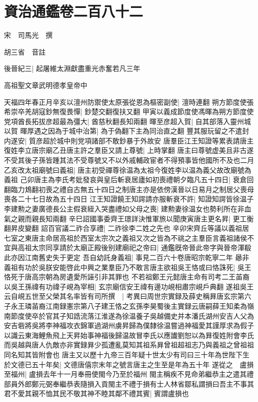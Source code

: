 \section{資治通鑑卷二百八十二}
宋　司馬光　撰

胡三省　音註

後晉紀三|{
	起屠維太淵獻盡重光赤奮若凡三年}


高祖聖文章武明德孝皇帝中

天福四年春正月辛亥以澶州防禦使太原張從恩為樞密副使|{
	澶時連翻}
朔方節度使張希崇卒羌胡寇鈔無復畏憚|{
	鈔楚交翻復扶又翻}
甲寅以義成節度使馮暉為朔方節度使党項酋長拓拔彦超最為彊大|{
	酋慈秋翻長知兩翻}
暉至彦超入賀|{
	自其部落入靈州城以賀}
暉厚遇之因為于城中治第|{
	為于偽翻下主為同治直之翻}
豐其服玩留之不遣封内遂安|{
	質彦超於城中則党項諸部不敢鈔暴于外故安}
唐羣臣江王知證等累表請唐主復姓李立唐宗廟乙丑唐主許之羣臣又請上尊號|{
	上時掌翻}
唐主曰尊號虚美且非古遂不受其後子孫皆踵其法不受尊號又不以外戚輔政宦者不得預事皆他國所不及也二月乙亥改太祖廟號曰義祖|{
	唐主初受禪尊徐温為太祖今復姓李以温為義父故改廟號為義祖}
己卯唐主為李氏考妣發哀與皇后斬衰居廬如初喪禮朝夕臨凡五十四日|{
	衰倉回翻臨力鴆翻初喪之禮自古無五十四日之制唐主亦是依傍漢晉以日易月之制居父喪母喪各二十七日故為五十四日}
江王知證饒王知諤請亦服斬衰不許|{
	知證知諤皆徐温子}
李建勲之妻廣德長公主假衰絰入哭盡禮如父母之喪|{
	建勲妻徐温女也勢利所在非血氣之親而親長知兩翻}
辛巳詔國事委齊王璟詳決惟軍旅以聞庚寅唐主更名昇|{
	更工衡翻昇皮變翻}
詔百官議二祚合享禮|{
	二祚徐李二姓之先也}
辛卯宋齊丘等議以義祖居七室之東唐主命居高祖於西室太宗次之義祖又次之皆為不祧之主羣臣言義祖諸侯不宜與高祖太宗同享請於太廟正殿後别建廟祀之帝曰|{
	通鑑旣帝晉此帝字與晉帝渾殽此亦因江南舊史失于更定}
吾自幼託身義祖|{
	事見二百六十卷唐昭宗乾寧二年}
曏非義祖有功於吳朕安能啓此中興之業羣臣乃不敢言唐主欲祖吳王恪或曰恪誅死|{
	吳王恪死于唐高宗朝為房遺愛所誣引非其罪也}
不若祖鄭王元懿唐主命有司考二王苖裔以吳王孫禕有功禕子峴為宰相|{
	玄宗廟信安王禕有邊功峴相肅宗峴戶典翻}
遂祖吳王云自峴五世至父榮其名率皆有司所撰　|{
	考異曰周世宗實録及薛史稱昪唐玄宗第六子永王璘苖裔江南録憲宗第八子建王恪之玄孫李昊蜀後主實録云唐嗣薛王知柔為嶺南節度使卒於官其子知誥流落江淮遂為徐温養子吳越備史并本潘氏湖州安吉人父為安吉砦將吳將李神福攻衣錦軍過湖州虜昇歸為僕隸徐温嘗過神福愛其謹厚求為假子以識云東海鯉魚飛上天昇始事神福後歸温故冒李氏以應䜟劉恕以為昪復姓附會李氏而吳越與唐人仇敵亦非實録昪少孤遭亂莫知其祖系昪曾祖超祖志乃與義祖之曾祖祖同名知其皆附會也}
唐主又以歷十九帝三百年疑十世太少有司曰三十年為世陛下生於文德已五十年矣|{
	文德唐僖宗末年之號言唐主之生至是年為五十年}
遂從之　盧損至福州|{
	盧損去年十一月奉冊使閩今乃至於福州}
閩主稱疾不見命弟繼恭主之遣其禮部員外郎鄭元弼奉繼恭表隨損入貢閩主不禮于損有士人林省鄒私謂損曰吾主不事其君不愛其親不恤其民不敬其神不睦其鄰不禮其賓|{
	賓謂盧損也}
